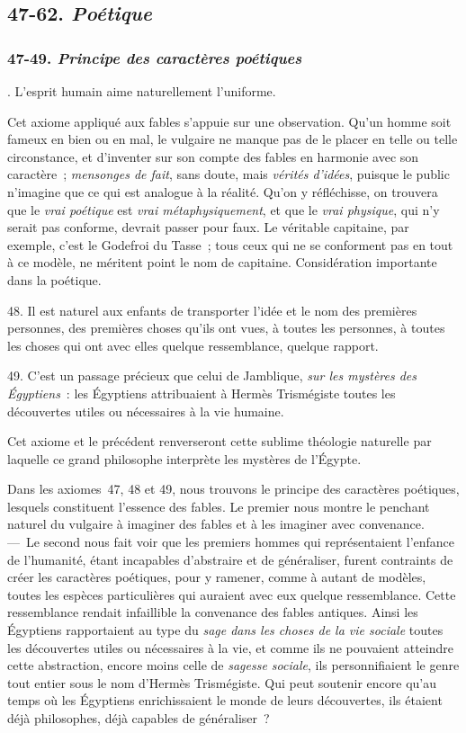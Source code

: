 \documentclass[french,twoside]{book} %
\begin{document}
\subsection[{47-62. Poétique}]{ \textsc{47-62. } {\itshape Poétique} }
\subsubsection[{47-49. Principe des caractères poétiques}]{ \textsc{47-49. } {\itshape Principe des caractères poétiques} }
. L’esprit humain aime naturellement l’uniforme.\par
Cet axiome appliqué aux fables s’appuie sur une observation. Qu’un homme soit fameux en bien ou en mal, le vulgaire ne manque pas de le placer en telle ou telle circonstance, et d’inventer sur son compte des fables en harmonie avec son caractère ; {\itshape mensonges de fait}, sans doute, mais {\itshape vérités d’idées}, puisque le public n’imagine que ce qui est analogue à la réalité. Qu’on y réfléchisse, on trouvera que le {\itshape vrai poétique} est {\itshape vrai métaphysiquement}, et que le {\itshape vrai physique}, qui n’y serait pas conforme, devrait passer pour faux. Le véritable capitaine, par exemple, c’est le Godefroi du Tasse ; tous ceux qui ne se conforment pas en tout à ce modèle, ne méritent point le nom de capitaine. Considération importante dans la poétique.\par
48. Il est naturel aux enfants de transporter l’idée et le nom des premières personnes, des premières choses qu’ils ont vues, à toutes les personnes, à toutes les choses qui ont avec elles quelque ressemblance, quelque rapport.\par
 49. C’est un passage précieux que celui de Jamblique, {\itshape sur les mystères des Égyptiens} : les Égyptiens attribuaient à Hermès Trismégiste toutes les découvertes utiles ou nécessaires à la vie humaine.\par
Cet axiome et le précédent renverseront cette sublime théologie naturelle par laquelle ce grand philosophe interprète les mystères de l’Égypte.\par
Dans les axiomes 47, 48 et 49, nous trouvons le principe des caractères poétiques, lesquels constituent l’essence des fables. Le premier nous montre le penchant naturel du vulgaire à imaginer des fables et à les imaginer avec convenance. — Le second nous fait voir que les premiers hommes qui représentaient l’enfance de l’humanité, étant incapables d’abstraire et de généraliser, furent contraints de créer les caractères poétiques, pour y ramener, comme à autant de modèles, toutes les espèces particulières qui auraient avec eux quelque ressemblance. Cette ressemblance rendait infaillible la convenance des fables antiques. Ainsi les Égyptiens rapportaient au type du {\itshape sage dans les choses de la vie sociale} toutes les découvertes utiles ou nécessaires à la vie, et comme ils ne pouvaient atteindre cette abstraction, encore moins celle de {\itshape sagesse sociale}, ils personnifiaient le genre tout entier sous le nom d’Hermès Trismégiste. Qui peut soutenir encore qu’au temps où les Égyptiens enrichissaient le monde de leurs découvertes, ils étaient déjà philosophes, déjà capables de généraliser ?
\end{document}
